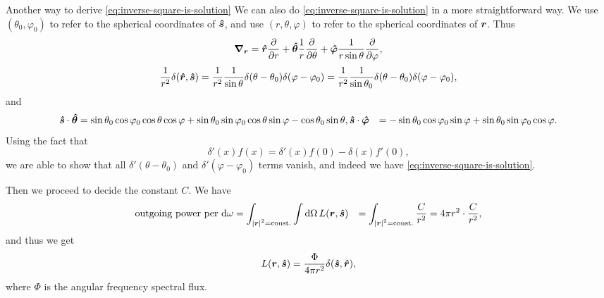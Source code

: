 \documentclass[hyperref, a4paper]{article}
\newcommand*{\const}{\mathrm{const}}
\def\\{}%
\begin{document}
\begin{infobox*}{Another way to derive \eqref{eq:inverse-square-is-solution}}
    We can also do \eqref{eq:inverse-square-is-solution} in a more straightforward way.
    We use $(\theta_0, \varphi_0)$ to refer to the spherical coordinates of $\vu*{s}$,
    and use $(r, \theta, \varphi)$ to refer to the spherical coordinates of $\vb*{r}$.
    Thus 
    \begin{equation}
        \grad_{\vb*{r}} = \vu*{r} \pdv{r} + \vu*{\theta} \frac{1}{r} \pdv{\theta} 
        + \vu*{\varphi} \frac{1}{r \sin \theta} \pdv{\varphi},
    \end{equation}
    \begin{equation}
        \frac{1}{r^2} \delta(\vu*{r}, \vu*{s}) = \frac{1}{r^2}
        \frac{1}{\sin \theta} \delta(\theta - \theta_0) \delta(\varphi - \varphi_0)
        = \frac{1}{r^2} \frac{1}{\sin \theta_0} \delta(\theta - \theta_0) \delta(\varphi - \varphi_0),
    \end{equation}
    and 
    \begin{equation}
        \begin{aligned}
            \vu*{s} \cdot \vu*{\theta} &= \sin \theta_0 \cos \varphi_0 \cos \theta \cos \varphi
            + \sin \theta_0 \sin \varphi_0 \cos \theta \sin \varphi 
            - \cos \theta_0 \sin \theta, \\ 
            \vu*{s} \cdot \vu*{\varphi} &= - \sin \theta_0 \cos \varphi_0 \sin \varphi 
            + \sin \theta_0 \sin \varphi_0 \cos \varphi.
        \end{aligned}
    \end{equation}
    Using the fact that 
    \begin{equation}
        \delta'(x) f(x) = \delta'(x) f(0) - \delta(x) f'(0),
    \end{equation}
    we are able to show that all $\delta'(\theta - \theta_0)$ and $\delta'(\varphi - \varphi_0)$
    terms vanish, and indeed we have \eqref{eq:inverse-square-is-solution}.
\end{infobox*}

Then we proceed to decide the constant $C$.
We have 
\begin{equation}
    \begin{aligned}
        \text{outgoing power per $\dd{\omega}$} &=
        \int_{\abs*{\vb*{r}}^2 = \const.} \int \dd{\Omega} L(\vb*{r}, \vu*{s}) \\
        &= \int_{\abs*{\vb*{r}}^2 = \const.} \frac{C}{r^2} = 4 \pi r^2 \cdot \frac{C}{r^2},
    \end{aligned}
    \label{eq:flux-around-point-source}
\end{equation}
and thus we get 
\begin{equation}
    L(\vb*{r}, \vu*{s}) = \frac{\Phi}{4 \pi r^2} \delta(\vu*{s}, \vu*{r}),
    \label{eq:ideal-inverse-square}
\end{equation}
where $\Phi$ is the angular frequency spectral flux. 
\end{document}
